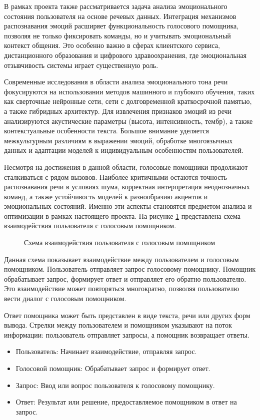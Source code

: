 В рамках проекта также рассматривается задача анализа эмоционального состояния пользователя на основе речевых данных. Интеграция механизмов распознавания эмоций расширяет функциональность голосового помощника, позволяя не только фиксировать команды, но и учитывать эмоциональный контекст общения. Это особенно важно в сферах клиентского сервиса, дистанционного образования и цифрового здравоохранения, где эмоциональная отзывчивость системы играет существенную роль.

Современные исследования в области анализа эмоционального тона речи фокусируются на использовании методов машинного и глубокого обучения, таких как сверточные нейронные сети, сети с долговременной краткосрочной памятью, а также гибридных архитектур. Для извлечения признаков эмоций из речи анализируются акустические параметры (высота, интенсивность, тембр), а также контекстуальные особенности текста. Большое внимание уделяется межкультурным различиям в выражении эмоций, обработке многоязычных данных и адаптации моделей к индивидуальным особенностям пользователей.

Несмотря на достижения в данной области, голосовые помощники продолжают сталкиваться с рядом вызовов. Наиболее критичными остаются точность распознавания речи в условиях шума, корректная интерпретация неоднозначных команд, а также устойчивость моделей к разнообразию акцентов и эмоциональных состояний. Именно эти аспекты становятся предметом анализа и оптимизации в рамках настоящего проекта.
На рисунке \ref{fig:VoiceAssistant} представлена схема  взаимодействия пользователя с голосовым помощником.
 \begin{figure}[H]
 	\centering
 	\caption{Схема взаимодействия пользователя с голосовым помощником}
 	\label{fig:VoiceAssistant}
 \end{figure}
 
 
 Данная схема показывает взаимодействие между пользователем и голосовым помощником. Пользователь отправляет запрос голосовому помощнику. Помощник обрабатывает запрос, формирует ответ и отправляет его обратно пользователю. Это взаимодействие может повторяться многократно, позволяя пользователю вести диалог с голосовым помощником.
 
 Ответ помощника может быть представлен в виде текста, речи или других форм вывода. Стрелки между пользователем и помощником указывают на поток информации: пользователь отправляет запросы, а помощник возвращает ответы.
 
 \begin{itemize}
 	\item Пользователь: Начинает взаимодействие, отправляя запрос.
 	\item Голосовой помощник: Обрабатывает запрос и формирует ответ.
 	\item Запрос: Ввод или вопрос пользователя к голосовому помощнику.
 	\item Ответ: Результат или решение, предоставляемое помощником в ответ на запрос.
 \end{itemize}
 
